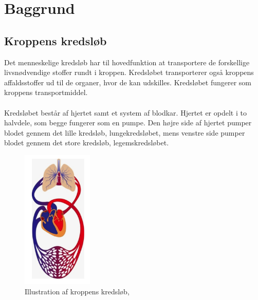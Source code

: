 \chapter{Baggrund}
\section{Kroppens kredsløb}
Det menneskelige kredsløb har til hovedfunktion at transportere de forskellige livsnødvendige stoffer rundt i kroppen. Kredsløbet transporterer også kroppens affaldsstoffer ud til de organer, hvor de kan udskilles. Kredsløbet fungerer som kroppens transportmiddel. 
\\ \\
Kredsløbet består af hjertet samt et system af blodkar. Hjertet er opdelt i to halvdele, som begge fungerer som en pumpe. Den højre side af hjertet pumper blodet gennem det lille kredsløb, lungekredsløbet, mens venstre side pumper blodet gennem det store kredsløb, legemskredsløbet. 

\begin{figure}[H]
	\centering
	\includegraphics[width=0.3\textwidth]{Figurer/Snip20151209_69}
	\caption{Illustration af kroppens kredsløb, \protect\cite{Legemkredslob billede}}
	\end{figure}

